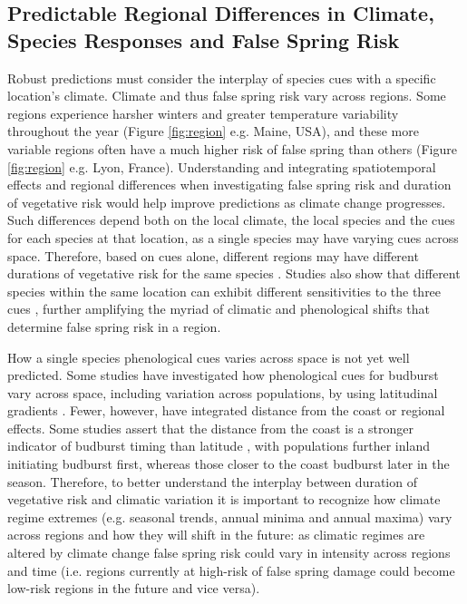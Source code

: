 \documentclass{article}\usepackage[]{graphicx}\usepackage[]{color}
\begin{document}
\subsection* {Predictable Regional Differences in Climate, Species Responses and False Spring Risk}
Robust predictions must consider the interplay of species cues with a specific location's climate. Climate and thus false spring risk vary across regions. Some regions experience harsher winters and greater temperature variability throughout the year (Figure \ref{fig:region} e.g. Maine, USA), and these more variable regions often have a much higher risk of false spring than others (Figure \ref{fig:region} e.g. Lyon, France). Understanding and integrating spatiotemporal effects and regional differences when investigating false spring risk and duration of vegetative risk would help improve predictions as climate change progresses. Such differences depend both on the local climate, the local species and the cues for each species at that location, as a single species may have varying cues across space. Therefore, based on cues alone, different regions may have different durations of vegetative risk for the same species \citep {Caffarra2011, Partanen2004, Viheraaarnio2006}. Studies also show that different species within the same location can exhibit different sensitivities to the three cues \citep{Basler2012, Laube2013}, further amplifying the myriad of climatic and phenological shifts that determine false spring risk in a region. 

How a single species phenological cues varies across space is not yet well predicted. Some studies have investigated how phenological cues for budburst vary across space, including variation across populations, by using latitudinal gradients \citep{Gauzere2017, Sogaard2008, Way2015, Zohner2016}. Fewer, however, have integrated distance from the coast \citep [but see][]{Aitken2015, Harrington2015, Myking2007} or regional effects. Some studies assert that the distance from the coast is a stronger indicator of budburst timing than latitude \citep{Myking2007}, with populations further inland initiating budburst first, whereas those closer to the coast budburst later in the season. Therefore, to better understand the interplay between duration of vegetative risk and climatic variation it is important to recognize how climate regime extremes (e.g. seasonal trends, annual minima and annual maxima) vary across regions and how they will shift in the future: as climatic regimes are altered by climate change false spring risk could vary in intensity across regions and time (i.e. regions currently at high-risk of false spring damage could become low-risk regions in the future and vice versa). 
\end{document}
